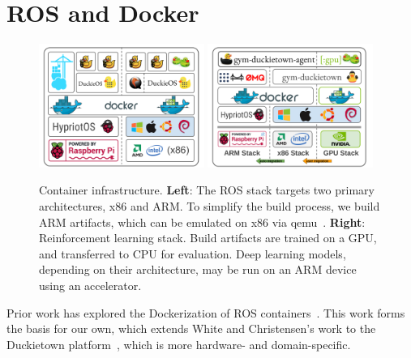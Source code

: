 \documentclass[12pt,initial,twoside,maitrise]{dms}
\numberwithin{equation}{section}
\numberwithin{table}{chapter}
\numberwithin{figure}{chapter}
\begin{document}
\section{ROS and Docker}

\begin{figure}[ht]
    \centering
    \includegraphics[width=0.48\textwidth]{docker_stack_1.png}
    \includegraphics[width=0.48\textwidth]{docker_stack_2.png}
    \caption{Container infrastructure. \textbf{Left}: The ROS stack targets two primary architectures, x86 and ARM. To simplify the build process, we build ARM artifacts, which can be emulated on x86 via qemu~\citep{bellard2005qemu}. \textbf{Right}: Reinforcement learning stack. Build artifacts are trained on a GPU, and transferred to CPU for evaluation. Deep learning models, depending on their architecture, may be run on an ARM device using an accelerator.}
    \label{fig:docker}
\end{figure}

Prior work has explored the Dockerization of ROS containers~\citep{white2017ros-docker}. This work forms the basis for our own, which extends White and Christensen's work to the Duckietown platform~\citep{paull2017duckietown}, which is more hardware- and domain-specific.
\end{document}
